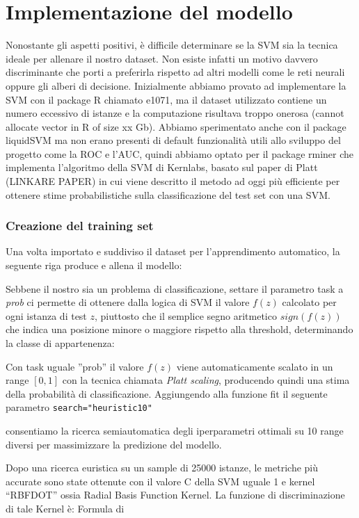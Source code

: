 \section{Implementazione del modello}

Nonostante gli aspetti positivi, è difficile determinare se la SVM sia la tecnica ideale per allenare il nostro dataset. Non esiste infatti un motivo davvero discriminante che porti a preferirla rispetto ad altri modelli come le reti neurali oppure gli alberi di decisione.
Inizialmente abbiamo provato ad implementare la SVM con il package R chiamato e1071, ma il dataset utilizzato contiene un numero eccessivo di istanze e la computazione risultava troppo onerosa (cannot allocate vector in R of size xx Gb). Abbiamo sperimentato anche con il package liquidSVM ma non erano presenti di default funzionalità utili allo sviluppo del progetto come la ROC e l'AUC, quindi abbiamo optato per il package rminer che implementa l’algoritmo della SVM di Kernlabs, basato sul paper di Platt (LINKARE PAPER) in cui viene descritto il metodo ad oggi più efficiente per ottenere stime probabilistiche sulla classificazione del test set con una SVM.

\subsubsection{Creazione del training set}


Una volta importato e suddiviso il dataset per l’apprendimento automatico, la seguente riga produce e allena il modello:

\texttt{}

Sebbene il nostro sia un problema di classificazione, settare il parametro task a \textit{prob} ci permette di ottenere dalla logica di SVM il valore $ f(z) $ calcolato per ogni istanza di test $z$, piuttosto che il semplice segno aritmetico $sign(f(z))$ che indica una posizione minore o maggiore rispetto alla threshold, determinando la classe di appartenenza:




Con task uguale ”prob” il valore $f(z)$ viene automaticamente scalato in un range $[0, 1]$ con la tecnica chiamata \textit{Platt scaling}, producendo quindi una stima della probabilità di classificazione.
Aggiungendo alla funzione fit il seguente parametro \texttt{search="heuristic10"}

consentiamo la ricerca semiautomatica degli iperparametri ottimali su 10 range diversi per massimizzare la predizione del modello.

Dopo una ricerca euristica su un sample di 25000 istanze, le metriche più accurate sono state ottenute con il valore C della SVM uguale 1 e kernel “RBFDOT” ossia Radial Basis Function Kernel.
La funzione di discriminazione di tale Kernel è:
Formula di 


